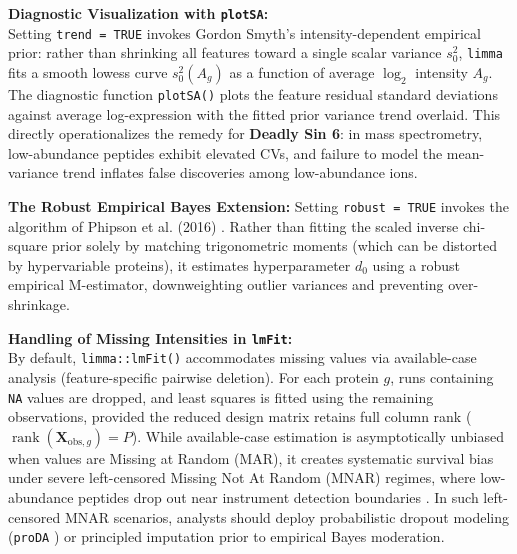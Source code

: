 \documentclass[11pt,twoside,openright]{book}
\begin{document}
\begin{notebox}
\textbf{Diagnostic Visualization with \texttt{plotSA}:}\\
Setting \texttt{trend = TRUE} invokes Gordon Smyth's intensity-dependent empirical prior: rather than shrinking all features toward a single scalar variance $s_0^2$, \texttt{limma} fits a smooth lowess curve $s_0^2(A_g)$ as a function of average $\log_2$ intensity $A_g$. The diagnostic function \texttt{plotSA()} plots the feature residual standard deviations against average log-expression with the fitted prior variance trend overlaid. This directly operationalizes the remedy for \textbf{Deadly Sin 6}: in mass spectrometry, low-abundance peptides exhibit elevated CVs, and failure to model the mean-variance trend inflates false discoveries among low-abundance ions.
\end{notebox}

\begin{deepdive}
\textbf{The Robust Empirical Bayes Extension:} Setting \texttt{robust = TRUE} invokes the algorithm of Phipson et al. (2016) \cite{phipson2016robust}. Rather than fitting the scaled inverse chi-square prior solely by matching trigonometric moments (which can be distorted by hypervariable proteins), it estimates hyperparameter $d_0$ using a robust empirical M-estimator, downweighting outlier variances and preventing over-shrinkage.
\end{deepdive}

\begin{notebox}
\textbf{Handling of Missing Intensities in \texttt{lmFit}:}\\
By default, \texttt{limma::lmFit()} accommodates missing values via available-case analysis (feature-specific pairwise deletion). For each protein $g$, runs containing \texttt{NA} values are dropped, and least squares is fitted using the remaining observations, provided the reduced design matrix retains full column rank ($\operatorname{rank}(\mathbf{X}_{\text{obs}, g}) = P$). While available-case estimation is asymptotically unbiased when values are Missing at Random (MAR), it creates systematic survival bias under severe left-censored Missing Not At Random (MNAR) regimes, where low-abundance peptides drop out near instrument detection boundaries \cite{lazar2016accounting}. In such left-censored MNAR scenarios, analysts should deploy probabilistic dropout modeling (\texttt{proDA} \cite{ahlmann2020proda}) or principled imputation prior to empirical Bayes moderation.
\end{notebox}
\end{document}
